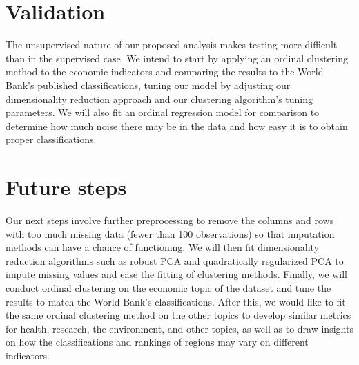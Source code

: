 \documentclass[a4paper]{article}
\begin{document}
\section{Validation}
The unsupervised nature of our proposed analysis makes testing more difficult than in the supervised case. We intend to start by applying an ordinal clustering method to the economic indicators and comparing the results to the World Bank's published classifications, tuning our model by adjusting our dimensionality reduction approach and our clustering algorithm's tuning parameters. We will also fit an ordinal regression model for comparison to determine how much noise there may be in the data and how easy it is to obtain proper classifications.
\section{Future steps}
Our next steps involve further preprocessing to remove the columns and rows with too much missing data (fewer than 100 observations) so that imputation methods can have a chance of functioning. We will then fit dimensionality reduction algorithms such as robust PCA and quadratically regularized PCA to impute missing values and ease the fitting of clustering methods. Finally, we will conduct ordinal clustering on the economic topic of the dataset and tune the results to match the World Bank's classifications. After this, we would like to fit the same ordinal clustering method on the other topics to develop similar metrics for health, research, the environment, and other topics, as well as to draw insights on how the classifications and rankings of regions may vary on different indicators.
\end{document}
